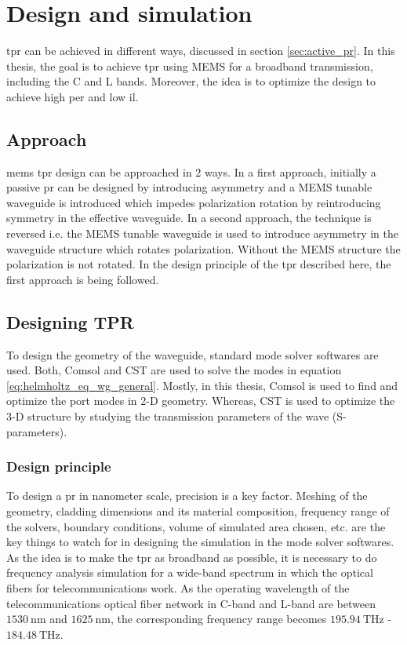 \documentclass[../report.tex]{subfiles}
\begin{document}
	

\chapter{Design and simulation}
\gls{tpr} can be achieved in different ways, discussed in section \ref*{sec:active_pr}. In this thesis, the goal is to achieve \gls{tpr} using MEMS for a broadband transmission, including the C and L bands. Moreover, the idea is to optimize the design to achieve high \gls{per} and low \gls{il}.  
	
	\section{Approach}
	\gls{mems} \gls{tpr} design can be approached in 2 ways. In a first approach, initially a passive \gls{pr} can be designed by introducing asymmetry and a MEMS tunable waveguide is introduced which impedes polarization rotation by reintroducing symmetry in the effective waveguide. In a second approach, the technique is reversed i.e. the MEMS tunable waveguide is used to introduce asymmetry in the waveguide structure which rotates polarization. Without the MEMS structure the polarization is not rotated. In the design principle of the \gls{tpr} described here, the first approach is being followed.  
	
	\section{Designing TPR}
	To design the geometry of the waveguide, standard mode solver softwares are used. Both, Comsol\cite{comsol_2015} and CST \cite{cst_2015} are used to solve the modes in equation \ref{eq:helmholtz_eq_wg_general}. Mostly, in this thesis, Comsol is used to find and optimize the port modes in 2-D geometry. Whereas, CST is used to optimize the 3-D structure by studying the transmission parameters of the wave (S-parameters).
	
		
		\subsection{Design principle}
To design a \gls{pr} in nanometer scale, precision is a key factor. Meshing of the geometry, cladding dimensions and its material composition, frequency range of the solvers, boundary conditions, volume of simulated area chosen, etc. are the key things to watch for in designing the simulation in the mode solver softwares. As the idea is to make the \gls{tpr} as broadband as possible, it is necessary to do frequency analysis simulation for a wide-band spectrum in which the optical fibers for telecommunications work. As the operating wavelength of the telecommunications optical fiber network in C-band and L-band are between $\SI{1530}{\nano\metre}$ and $\SI{1625}{\nano\metre}$, the corresponding frequency range becomes $\SI{195.94}{\THz}$ - $\SI{184.48}{\THz}$.
	
\end{document}
